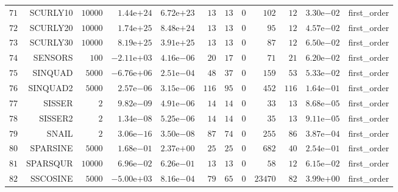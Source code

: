 \begin{longtable}{rrrrrrrrrrrr}
  \(    71\) & SCURLY10 & \( 10000\) & \( 1.44\)e\(+24\) & \( 6.72\)e\(+23\) & \(    13\) & \(    13\) & \(     0\) & \(   102\) & \(    12\) & \( 3.30\)e\(-02\) & first\_order \\
  \(    72\) & SCURLY20 & \( 10000\) & \( 1.74\)e\(+25\) & \( 8.48\)e\(+24\) & \(    13\) & \(    13\) & \(     0\) & \(    95\) & \(    12\) & \( 4.57\)e\(-02\) & first\_order \\
  \(    73\) & SCURLY30 & \( 10000\) & \( 8.19\)e\(+25\) & \( 3.91\)e\(+25\) & \(    13\) & \(    13\) & \(     0\) & \(    87\) & \(    12\) & \( 6.50\)e\(-02\) & first\_order \\
  \(    74\) & SENSORS & \(   100\) & \(-2.11\)e\(+03\) & \( 4.16\)e\(-06\) & \(    20\) & \(    17\) & \(     0\) & \(    71\) & \(    21\) & \( 6.20\)e\(-02\) & first\_order \\
  \(    75\) & SINQUAD & \(  5000\) & \(-6.76\)e\(+06\) & \( 2.51\)e\(-04\) & \(    48\) & \(    37\) & \(     0\) & \(   159\) & \(    53\) & \( 5.33\)e\(-02\) & first\_order \\
  \(    76\) & SINQUAD2 & \(  5000\) & \( 2.57\)e\(-06\) & \( 3.15\)e\(-06\) & \(   116\) & \(    95\) & \(     0\) & \(   452\) & \(   116\) & \( 1.64\)e\(-01\) & first\_order \\
  \(    77\) & SISSER & \(     2\) & \( 9.82\)e\(-09\) & \( 4.91\)e\(-06\) & \(    14\) & \(    14\) & \(     0\) & \(    33\) & \(    13\) & \( 8.68\)e\(-05\) & first\_order \\
  \(    78\) & SISSER2 & \(     2\) & \( 1.34\)e\(-08\) & \( 5.25\)e\(-06\) & \(    14\) & \(    14\) & \(     0\) & \(    35\) & \(    13\) & \( 9.11\)e\(-05\) & first\_order \\
  \(    79\) & SNAIL & \(     2\) & \( 3.06\)e\(-16\) & \( 3.50\)e\(-08\) & \(    87\) & \(    74\) & \(     0\) & \(   255\) & \(    86\) & \( 3.87\)e\(-04\) & first\_order \\
  \(    80\) & SPARSINE & \(  5000\) & \( 1.68\)e\(-01\) & \( 2.37\)e\(+00\) & \(    25\) & \(    25\) & \(     0\) & \(   682\) & \(    40\) & \( 2.54\)e\(-01\) & first\_order \\
  \(    81\) & SPARSQUR & \( 10000\) & \( 6.96\)e\(-02\) & \( 6.26\)e\(-01\) & \(    13\) & \(    13\) & \(     0\) & \(    58\) & \(    12\) & \( 6.15\)e\(-02\) & first\_order \\
  \(    82\) & SSCOSINE & \(  5000\) & \(-5.00\)e\(+03\) & \( 8.16\)e\(-04\) & \(    79\) & \(    65\) & \(     0\) & \( 23470\) & \(    82\) & \( 3.99\)e\(+00\) & first\_order \\

\end{longtable}
